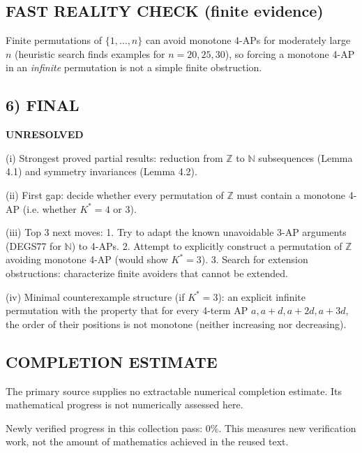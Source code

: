 \subsection*{FAST REALITY CHECK (finite evidence)}
Finite permutations of $\{1,\dots,n\}$ can avoid monotone 4-APs for moderately large $n$ (heuristic search finds examples for $n=20,25,30$),
so forcing a monotone 4-AP in an \emph{infinite} permutation is not a simple finite obstruction.

\subsection*{6) FINAL}
\textbf{UNRESOLVED}

(i) Strongest proved partial results: reduction from $\mathbb{Z}$ to $\mathbb{N}$ subsequences (Lemma 4.1) and symmetry invariances (Lemma 4.2).

(ii) First gap: decide whether every permutation of $\mathbb{Z}$ must contain a monotone 4-AP (i.e. whether $K^*=4$ or $3$).

(iii) Top 3 next moves:
1. Try to adapt the known unavoidable 3-AP arguments (DEGS77 for $\mathbb{N}$) to 4-APs.
2. Attempt to explicitly construct a permutation of $\mathbb{Z}$ avoiding monotone 4-AP (would show $K^*=3$).
3. Search for extension obstructions: characterize finite avoiders that cannot be extended.

(iv) Minimal counterexample structure (if $K^*=3$): an explicit infinite permutation with the property that for every 4-term AP
$a,a+d,a+2d,a+3d$, the order of their positions is not monotone (neither increasing nor decreasing).



\subsection*{COMPLETION ESTIMATE}
The primary source supplies no extractable numerical completion estimate. Its mathematical progress is not numerically assessed here.

Newly verified progress in this collection pass: $0\%$. This measures new verification work, not the amount of mathematics achieved in the reused text.
